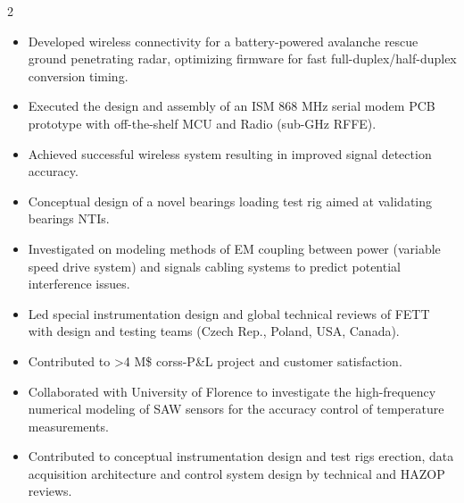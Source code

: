 \documentclass[9pt,a4paper,ragged2e,withhyper]{altacv} %
\begin{document}
\begin{paracol}{2}
\begin{itemize}
\item Developed wireless connectivity for a battery-powered avalanche rescue ground penetrating radar, optimizing firmware for fast full-duplex/half-duplex conversion timing.
\item Executed the design and assembly of an ISM 868 MHz serial modem PCB prototype with off-the-shelf MCU and Radio (sub-GHz RFFE).
\item Achieved successful wireless system resulting in improved signal detection accuracy.
\end{itemize}


\begin{itemize}
  \item Conceptual design of a novel bearings loading test rig aimed at validating bearings NTIs. 
  \item Investigated on modeling methods of EM coupling between power (variable speed drive system) 
  and signals cabling systems to predict potential interference issues.
\end{itemize}
\divider

\begin{itemize}
  \item Led special instrumentation design and global technical reviews of FETT with design
and testing teams (Czech Rep., Poland, USA, Canada).
  \item Contributed to >4 M\$ corss-P\&L project and customer satisfaction.
\end{itemize}
\divider

\begin{itemize}
\item Collaborated with University of Florence to investigate the high-frequency numerical modeling of SAW sensors for the accuracy control of temperature measurements.
\end{itemize}
\divider

\begin{itemize}
\item Contributed to conceptual instrumentation design and test rigs erection, data
acquisition architecture and control system design by technical and HAZOP reviews.
\end{itemize}
\divider


\end{paracol}
\end{document}
